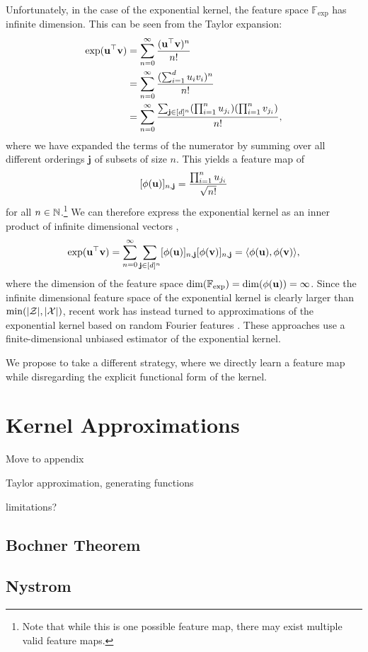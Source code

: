 \documentclass{article}
\begin{document}
Unfortunately, in the case of the exponential kernel, the feature space $\mathbb{F}_{\exp}$
has infinite dimension.
This can be seen from the Taylor expansion:
\begin{align*}
\exp(\mathbf{u}^\top \mathbf{v})
&= \sum_{n=0}^\infty \frac{(\mathbf{u}^\top \mathbf{v})^n}{n!}\\
&= \sum_{n=0}^\infty \frac{(\sum_{i=1}^du_iv_i)^n}{n!}\\
&= \sum_{n=0}^\infty \frac{\sum_{\mathbf{j} \in [d]^n}(\prod_{i=1}^n u_{j_i})(\prod_{i=1}^n v_{j_i})}{n!},
\end{align*}
where we have expanded the terms of the numerator by summing over all different orderings
$\mathbf{j}$ of subsets of size $n$.
This yields a feature map of 
$$[\phi(\mathbf{u})]_{n,\mathbf{j}} = \frac{\prod_{i=1}^n u_{j_i}}{\sqrt{n!}}$$
for all $n\in\mathbb{N}$.\footnote{
Note that while this is one possible feature map, there may exist
multiple valid feature maps.
}
We can therefore express the exponential kernel as an inner product of
infinite dimensional vectors \citep{cotter2011gausskernel},
$$\exp(\mathbf{u}^\top\mathbf{v}) 
= \sum_{n=0}^\infty\sum_{\mathbf{j}\in[d]^n}[\phi(\mathbf{u})]_{n,\mathbf{j}}[\phi(\mathbf{v})]_{n,\mathbf{j}}
= \langle \phi(\mathbf{u}), \phi(\mathbf{v}) \rangle,
$$
where the dimension of the feature space $\dim(\mathbb{F}_{\exp}) = \dim(\phi(\mathbf{u})) = \infty$.
Since the infinite dimensional feature space of the exponential kernel is clearly larger than
$\min(|\mathcal{Z}|,|\mathcal{X}|)$, recent work has instead turned to approximations of the exponential kernel
based on random Fourier features
\citep{rawat2019sampledsoftmax,choromanski2020performer,peng2021rfa}.
These approaches use a finite-dimensional unbiased estimator of the exponential kernel.

We propose to take a different strategy, where we directly learn a feature map
while disregarding the explicit functional form of the kernel.

\section{Kernel Approximations}
Move to appendix

Taylor approximation, generating functions

limitations?
\subsection{Bochner Theorem}
\subsection{Nystrom}
\end{document}
